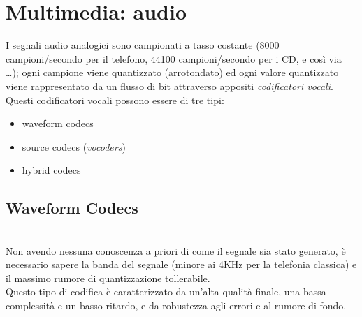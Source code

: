 \section{Multimedia: audio}
I segnali audio analogici sono campionati a tasso costante (8000 campioni/secondo per il telefono, 44100 campioni/secondo per i CD, e così via \ldots); ogni campione viene quantizzato (arrotondato) ed ogni valore quantizzato viene rappresentato da un flusso di bit attraverso appositi \textit{codificatori vocali}.\\
Questi codificatori vocali possono essere di tre tipi:
\begin{itemize}
	\item waveform codecs
	\item source codecs (\textit{vocoders})
	\item hybrid codecs
\end{itemize}

\subsection{Waveform Codecs}\hfill\\
Non avendo nessuna conoscenza a priori di come il segnale sia stato generato, è necessario sapere la banda del segnale (minore ai 4KHz per la telefonia classica) e il massimo rumore di quantizzazione tollerabile.\\
Questo tipo di codifica è caratterizzato da un'alta qualità finale, una bassa complessità e un basso ritardo, e da robustezza agli errori e al rumore di fondo.

